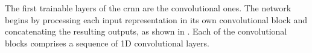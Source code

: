
The first trainable layers of the \gls{crnn} are the
convolutional ones. The network begins by processing each
input representation in its own convolutional block and
concatenating the resulting outputs, as shown in
. Each of the convolutional
blocks comprises a sequence of 1D convolutional layers.

